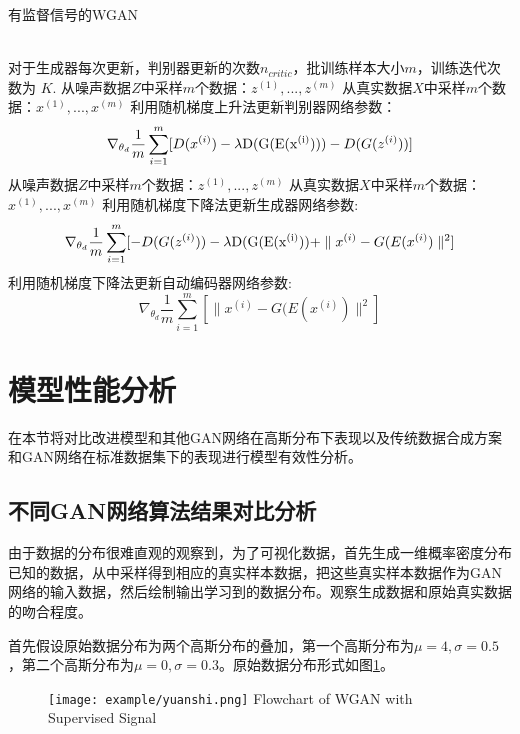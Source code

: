 \begin{algorithm}[htpb]
	\caption{有监督信号的WGAN}%
	\label{al:improved WGAN}
	\begin{algorithmic}[1]%
		\Require ~~ \\
		对于生成器每次更新，判别器更新的次数$n_{critic}$，批训练样本大小$m$，训练迭代次数为 $K$.
		\State 从噪声数据$Z$中采样$m$个数据：${z^{(1)},...,z^{(m)}}$
		\State 从真实数据$X$中采样$m$个数据：${x^{(1)},...,x^{(m)}}$ 
		\State 利用随机梯度上升法更新判别器网络参数：
		\begin{equation*}
		\nabla_{\theta_{d}}\frac{1}{m}\sum_{i=1}^m[D(x^{(i)})-\lambda {\rm{D(G(E(x^{(i)})))}}-D(G(z^{(i)}))]  
		\end{equation*}
		\EndFor
		\State 从噪声数据$Z$中采样$m$个数据：${z^{(1)},...,z^{(m)}}$
		\State 从真实数据$X$中采样$m$个数据：${x^{(1)},...,x^{(m)}}$
		\State 利用随机梯度下降法更新生成器网络参数:
		\begin{equation*}
		\nabla_{\theta_{d}}\frac{1}{m}\sum_{i=1}^m[-D(G(z^{(i)}))-\lambda {\rm{D(G(E(x^{(i)}))}}+\parallel x^{(i)}-G(E(x^{(i)})\parallel^{2}]
		\end{equation*}
		\State 利用随机梯度下降法更新自动编码器网络参数:
		\begin{equation*}
		\nabla_{\theta_{d}}\frac{1}{m}\sum_{i=1}^m[\parallel x^{(i)}-G(E(x^{(i)})\parallel^{2}]
		\end{equation*}
		\EndFor
	\end{algorithmic}
\end{algorithm}
\section{模型性能分析}
在本节将对比改进模型和其他GAN网络在高斯分布下表现以及传统数据合成方案和GAN网络在标准数据集下的表现进行模型有效性分析。
\subsection{不同GAN网络算法结果对比分析}
由于数据的分布很难直观的观察到，为了可视化数据，首先生成一维概率密度分布已知的数据，从中采样得到相应的真实样本数据，把这些真实样本数据作为GAN网络的输入数据，然后绘制输出学习到的数据分布。观察生成数据和原始真实数据的吻合程度。

首先假设原始数据分布为两个高斯分布的叠加，第一个高斯分布为$\mu=4,\sigma=0.5$，第二个高斯分布为$\mu=0,\sigma=0.3$。原始数据分布形式如图\ref{figyuanshi}。
\begin{figure}[htbp]
	\centering
	\texttt{[image: example/yuanshi.png]}
	{Flowchart of WGAN with Supervised Signal}
	\label{figyuanshi}
\end{figure}

